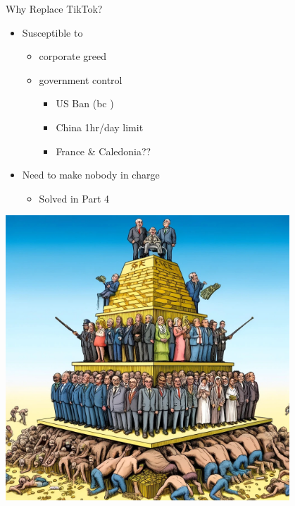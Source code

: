\documentclass[aspectratio=35]{beamer} %
\begin{document}
\begin{frame}{Why Replace TikTok?}
\vspace{-0.4in}
\begin{itemize}
    \item Susceptible to 
    \begin{itemize}
        \item corporate greed
        \item government control 
        \begin{itemize}
            \item US Ban (bc )
            \item China 1hr/day limit
            \item France \& Caledonia??
        \end{itemize}
    \end{itemize}
    \item Need to make nobody in charge
    \begin{itemize}
        \item Solved in Part 4
    \end{itemize}
\end{itemize}
\centering
\includegraphics[width=0.8\textwidth]{imgs/why_replace/power_pyramid.jpeg}
\end{frame}
\end{document}
